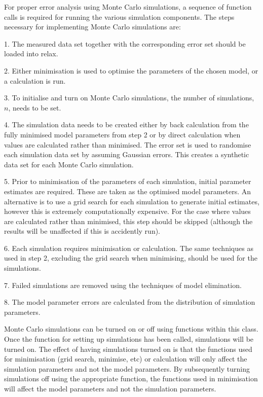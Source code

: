 For proper error analysis using Monte Carlo simulations, a sequence  of function calls is
required for running the various simulation components.  The steps necessary for
implementing Monte Carlo simulations are:

1.  The measured data set together with the corresponding error set should be loaded into
relax.

2.  Either minimisation  is used to optimise  the parameters of the chosen model, or a
calculation is run.

3.  To initialise and turn on Monte Carlo simulations, the number of simulations, $n$, needs
to be set.

4.  The simulation data needs to be created either by back calculation from the fully
minimised  model parameters from step 2 or by direct calculation when values are calculated
rather than minimised.   The error set is used to randomise each simulation data set by
assuming Gaussian errors.  This creates a synthetic data set for each Monte Carlo
simulation.

5.  Prior to minimisation  of the parameters of each simulation, initial parameter estimates
are required.  These are taken as the optimised  model parameters.  An alternative is to use
a grid search for each simulation to generate initial estimates, however this is extremely
computationally expensive.  For the case where values are calculated rather than minimised, 
this step should be skipped (although the results will be unaffected if this is accidently
run).

6.  Each simulation requires minimisation  or calculation.  The same techniques as used in
step 2, excluding the grid search when minimising, should be used for the simulations.

7.  Failed simulations are removed using the techniques of model elimination.  

8.  The model parameter errors are calculated from the distribution of simulation
parameters.


Monte Carlo simulations can be turned on or off using functions within this class.  Once the
function for setting up simulations has been called, simulations will be turned on.  The
effect of having simulations turned on is that the functions used for minimisation  (grid
search, minimise,  etc) or calculation will only affect the simulation parameters and not the
model parameters.  By subsequently turning simulations off using the appropriate function,
the functions used in minimisation  will affect the model parameters and not the simulation
parameters.


